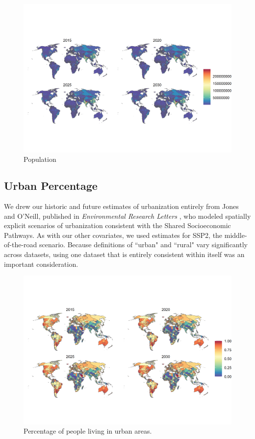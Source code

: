 \documentclass{article}
\begin{document}
\begin{figure}[H]
  \centering
  \includegraphics[width=\linewidth]{img/covars/population.png}
  \caption{Population}
\end{figure}

\subsection{Urban Percentage}

We drew our historic and future estimates of urbanization entirely from Jones and O'Neill, published in \textit{Environmental Research Letters} \citep{Jones2016}, who modeled spatially explicit scenarios of urbanization consistent with the Shared Socioeconomic Pathways.  As with our other covariates, we used estimates for SSP2, the middle-of-the-road scenario.  Because definitions of ``urban" and ``rural" vary significantly across datasets, using one dataset that is entirely consistent within itself was an important consideration.

\begin{figure}[H]
  \centering
  \includegraphics[width=\linewidth]{img/covars/urban_perc.png}
  \caption{Percentage of people living in urban areas.}
\end{figure}
\end{document}
